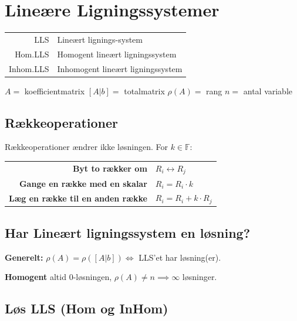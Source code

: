\section{Lineære Ligningssystemer}

\begin{center}
    \begin{tabular}{r | l}
        LLS & Lineært lignings-system \\
        Hom.LLS & Homogent lineært ligningssystem \\
        Inhom.LLS & Inhomogent lineært ligningssystem \\
    \end{tabular}

    $A =$ koefficientmatrix \hfill $[A|b] =$ totalmatrix \hfill $\rho(A) =$ rang \hfill $n =$ antal variable
\end{center}

\subsection{Rækkeoperationer}
Rækkeoperationer ændrer ikke løsningen. For $k \in \mathbb{F}$:

\begin{center}
    \begin{tabular}{r|l}
        \textbf{Byt to rækker om} & $R_i \leftrightarrow R_j$ \\
        \textbf{Gange en række med en skalar} & $R_i = R_i \cdot k$ \\
        \textbf{Læg en række til en anden række} & $R_i = R_i + k \cdot R_j$ \\
    \end{tabular}
\end{center}

\subsection{Har Lineært ligningssystem en løsning?}

\textbf{Generelt:} $\rho(A) = \rho([A|b]) \iff$ LLS'et har løsning(er).

\textbf{Homogent} altid 0-løsningen, $\rho(A) \ne n \implies \infty$ løsninger.

\subsection{Løs LLS (Hom og InHom)}

